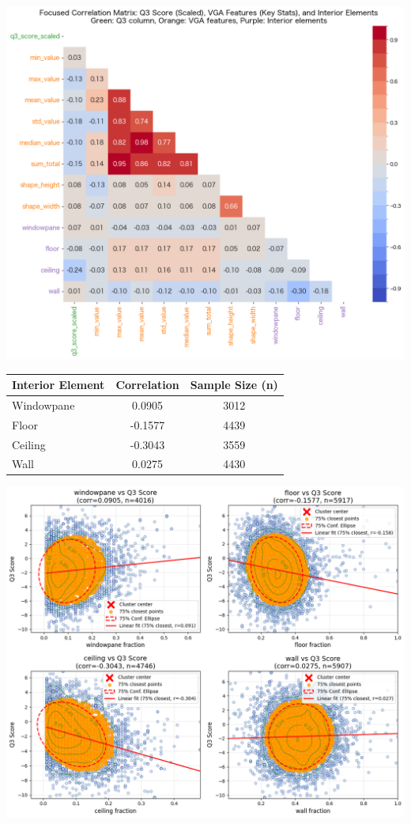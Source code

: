 \documentclass[11pt,a4paper]{article}
\begin{document}
\begin{multicols}{2}
\begin{center}
    \includegraphics[width=0.8\columnwidth]{plots/corr_vga_q3.png}
    \label{fig:corr_vga_q3}
\end{center}


\begin{center}
\begin{tabular}{lcc}
\hline
Interior Element & Correlation & Sample Size (n) \\
\hline
Windowpane & 0.0905 & 3012 \\
Floor & -0.1577 & 4439 \\
Ceiling & -0.3043 & 3559 \\
Wall & 0.0275 & 4430 \\
\hline
\end{tabular}
\label{tab:interior_corr}
\end{center}

\begin{center}
    \includegraphics[width=0.9\columnwidth]{plots/inter_q3_cluster.png}
    \label{fig:inter_q3_cluster}
\end{center}




\end{multicols}
\end{document}
